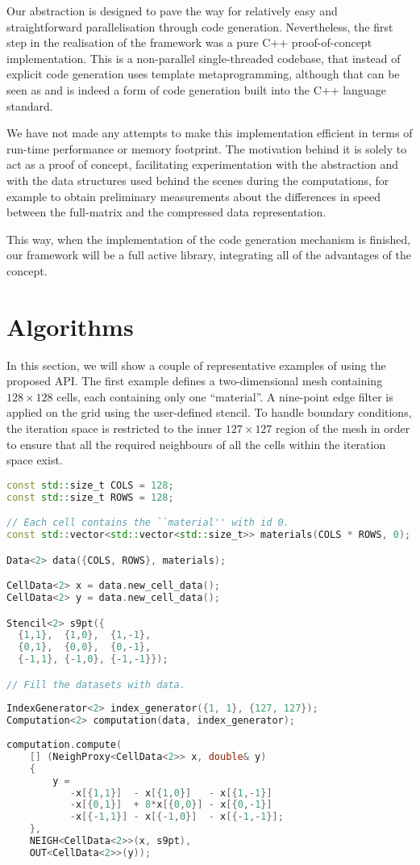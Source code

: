 \documentclass[fontsize=11pt, appendixprefix=true]{scrreprt}
\begin{document}
Our abstraction is designed to pave the way for relatively easy and
straightforward parallelisation through code generation. Nevertheless, the first
step in the realisation of the framework was a pure C++ proof-of-concept
implementation. This is a non-parallel single-threaded codebase, that instead of
explicit code generation uses template metaprogramming, although that can be
seen as and is indeed a form of code generation built into the C++ language
standard.

We have not made any attempts to make this implementation efficient in terms of
run-time performance or memory footprint. The motivation behind it is solely to
act as a proof of concept, facilitating experimentation with the abstraction and
with the data structures used behind the scenes during the computations, for
example to obtain preliminary measurements about the differences in speed
between the full-matrix and the compressed data representation.

This way, when the implementation of the code generation mechanism is finished,
our framework will be a full active library, integrating all of the advantages
of the concept.

\section{Algorithms}

In this section, we will show a couple of representative examples of using the
proposed API. The first example defines a two-dimensional mesh containing $128
\times 128$ cells, each containing only one ``material''. A nine-point edge
filter is applied on the grid using the user-defined stencil. To handle boundary
conditions, the iteration space is restricted to the inner $127 \times 127$
region of the mesh in order to ensure that all the required neighbours of all
the cells within the iteration space exist.

\begin{lstlisting}[language=c++]
const std::size_t COLS = 128;
const std::size_t ROWS = 128;

// Each cell contains the ``material'' with id 0.
const std::vector<std::vector<std::size_t>> materials(COLS * ROWS, 0);

Data<2> data({COLS, ROWS}, materials);

CellData<2> x = data.new_cell_data();
CellData<2> y = data.new_cell_data();

Stencil<2> s9pt({
  {1,1},  {1,0},  {1,-1},
  {0,1},  {0,0},  {0,-1},
  {-1,1}, {-1,0}, {-1,-1}});

// Fill the datasets with data.
	
IndexGenerator<2> index_generator({1, 1}, {127, 127});
Computation<2> computation(data, index_generator);
	
computation.compute(
    [] (NeighProxy<CellData<2>> x, double& y)
    {
        y = 
           -x[{1,1}]  - x[{1,0}]   - x[{1,-1}]
           -x[{0,1}]  + 8*x[{0,0}] - x[{0,-1}]
           -x[{-1,1}] - x[{-1,0}]  - x[{-1,-1}];
    },
    NEIGH<CellData<2>>(x, s9pt),
    OUT<CellData<2>>(y));
\end{lstlisting}
\end{document}
